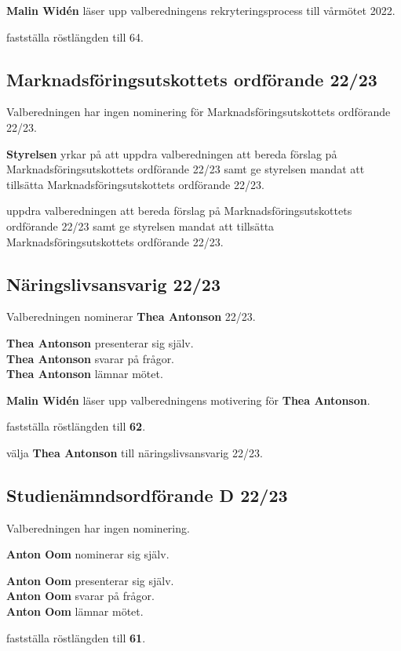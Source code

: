 \documentclass[../protokoll_varmote_2022.tex]{subfiles}
\begin{document}
\textbf{Malin Widén} läser upp valberedningens rekryteringsprocess till vårmötet 2022.

\motetbeslutar\att{} fastställa röstlängden till 64.

\subsection{Marknadsföringsutskottets ordförande 22/23}
Valberedningen har ingen nominering för Marknadsföringsutskottets ordförande 22/23.

\textbf{Styrelsen} yrkar på att uppdra valberedningen att bereda förslag på Marknadsföringsutskottets ordförande 22/23 samt
ge styrelsen mandat att tillsätta Marknadsföringsutskottets ordförande 22/23.

\motetbeslutar\att{} uppdra valberedningen att bereda förslag på Marknadsföringsutskottets ordförande 22/23 samt
ge styrelsen mandat att tillsätta Marknadsföringsutskottets ordförande 22/23.

\subsection{Näringslivsansvarig 22/23}
Valberedningen nominerar \textbf{Thea Antonson} 22/23.

\textbf{Thea Antonson} presenterar sig själv. \\
\textbf{Thea Antonson} svarar på frågor. \\
\textbf{Thea Antonson} lämnar mötet.

\textbf{Malin Widén} läser upp valberedningens motivering för \textbf{Thea Antonson}.

\motetbeslutar\att{} fastställa röstlängden till \textbf{62}.

\motetbeslutar\att{} välja \textbf{Thea Antonson} till näringslivsansvarig 22/23.




\subsection{Studienämndsordförande D 22/23}
Valberedningen har ingen nominering.

\textbf{Anton Oom} nominerar sig själv. 

\textbf{Anton Oom} presenterar sig själv. \\
\textbf{Anton Oom} svarar på frågor. \\
\textbf{Anton Oom} lämnar mötet.

\motetbeslutar\att{} fastställa röstlängden till \textbf{61}.
\end{document}
